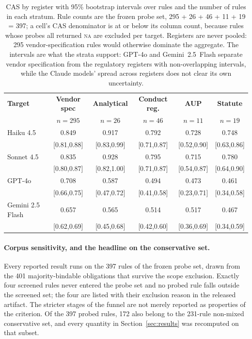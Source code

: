 \documentclass{article}
\begin{document}
\begin{table}[h]
\centering
\small
\setlength{\tabcolsep}{4pt}
\caption{CAS by register with 95\% bootstrap intervals over rules and the number of rules in each
stratum. Rule counts are the frozen probe set, 295 + 26 + 46 + 11 + 19 = 397; a cell's CAS
denominator is at or below its column count, because rules whose probes all returned
\textsc{na} are excluded per target. Registers are never pooled: 295 vendor-specification
rules would otherwise dominate the aggregate. The intervals are what the strata support: GPT-4o and Gemini~2.5~Flash separate vendor
specification from the regulatory registers with non-overlapping intervals, while the Claude
models' spread across registers does not clear its own uncertainty.}
\label{tab:byclass-app}
\begin{tabular}{@{}lccccc@{}}
\toprule
\textbf{Target} & \textbf{Vendor spec} & \textbf{Analytical} & \textbf{Conduct reg.} & \textbf{AUP} & \textbf{Statute} \\
& $n{=}295$ & $n{=}26$ & $n{=}46$ & $n{=}11$ & $n{=}19$ \\
\midrule
Haiku 4.5 & 0.849 & 0.917 & 0.792 & 0.728 & 0.748 \\
 & \tiny[0.81,0.88] & \tiny[0.83,0.99] & \tiny[0.71,0.87] & \tiny[0.52,0.90] & \tiny[0.63,0.86] \\
Sonnet 4.5 & 0.835 & 0.928 & 0.795 & 0.715 & 0.780 \\
 & \tiny[0.80,0.87] & \tiny[0.82,1.00] & \tiny[0.71,0.87] & \tiny[0.54,0.87] & \tiny[0.64,0.90] \\
GPT-4o & 0.708 & 0.587 & 0.494 & 0.473 & 0.461 \\
 & \tiny[0.66,0.75] & \tiny[0.47,0.72] & \tiny[0.41,0.58] & \tiny[0.23,0.71] & \tiny[0.34,0.58] \\
Gemini 2.5 Flash & 0.657 & 0.565 & 0.514 & 0.517 & 0.467 \\
 & \tiny[0.62,0.69] & \tiny[0.45,0.68] & \tiny[0.42,0.60] & \tiny[0.36,0.69] & \tiny[0.34,0.59] \\
\bottomrule
\end{tabular}
\end{table}

\paragraph{Corpus sensitivity, and the headline on the conservative set.}
Every reported result runs on the 397 rules of the frozen probe set, drawn from the 401
majority-bindable obligations that survive the scope exclusion. Exactly four screened rules
never entered the probe set and no probed rule falls outside the screened set; the four are
listed with their exclusion reason in the released artifact. The stricter stages of the
funnel are not merely reported as properties of the criterion. Of the 397 probed rules, 172 also
belong to the 231-rule non-mixed conservative set, and every quantity in
Section~\ref{sec:results} was recomputed on that subset.
\end{document}
